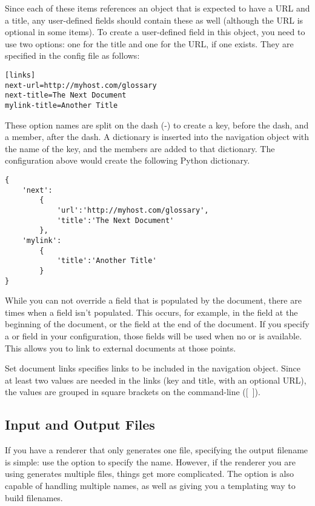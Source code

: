 Since each of these items references an object that is expected to have
a URL and a title, any user-defined fields should contain these as well
(although the URL is optional in some items).  To create a user-defined
field in this object, you need to use two options: one for the title
and one for the URL, if one exists.  They are specified in the config
file as follows:
\begin{verbatim}
[links]
next-url=http://myhost.com/glossary
next-title=The Next Document
mylink-title=Another Title
\end{verbatim}

These option names are split on the dash (-) to create a key, before the dash,
and a member, after the dash.  A dictionary is inserted into the navigation
object with the name of the key, and the members are added to that dictionary.
The configuration above would create the following Python dictionary.
\begin{verbatim}
{
    'next':
        {
            'url':'http://myhost.com/glossary', 
            'title':'The Next Document'
        },
    'mylink':
        {
            'title':'Another Title'
        }
}
\end{verbatim}

While you can not override a field that is populated by the document, 
there are times when a field isn't populated.  This occurs, for example,
in the  field at the beginning of the document, or the 
 field at the end of the document.  If you specify a 
or  field in your configuration, those fields will be used
when no  or  is available.  This allows you to link
to external documents at those points.


\begin{configuration}{Set document links}
specifies links to be included in the navigation object.  Since at
least two values are needed in the links (key and title, with an optional
URL), the values are grouped in square brackets on the command-line ([~]).
\end{configuration}


\subsection{Input and Output Files\label{sec:config-files}}

If you have a renderer that only generates one file, specifying the output
filename is simple: use the  option to specify
the name.  However, if the renderer you are using generates multiple
files, things get more complicated.  The  option
is also capable of handling multiple names, as well as giving you a
templating way to build filenames.

